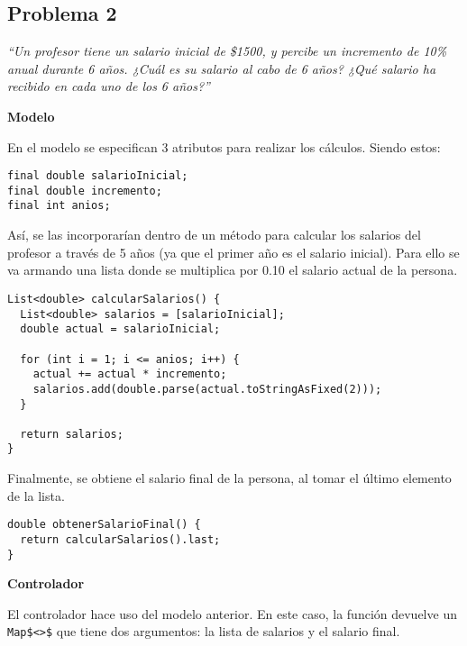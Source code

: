 \subsection{Problema 2}

\textit {“Un profesor tiene un salario inicial de \$1500, y percibe un incremento de 10\% anual durante 6 años. ¿Cuál es su salario al cabo de 6 años? ¿Qué salario ha recibido en cada uno de los 6 años?”}

\textbf{Modelo}

En el modelo se especifican 3 atributos para realizar los cálculos. Siendo estos:

\begin{center}
\begin{lstlisting}
final double salarioInicial;
final double incremento;
final int anios;
\end{lstlisting}
\end{center}

Así, se las incorporarían dentro de un método para calcular los salarios del profesor a través de 5 años (ya que el primer año es el salario inicial). Para ello se va armando una lista donde se multiplica por 0.10 el salario actual de la persona.

\begin{center}
\begin{lstlisting}
List<double> calcularSalarios() {
  List<double> salarios = [salarioInicial];
  double actual = salarioInicial;

  for (int i = 1; i <= anios; i++) {
    actual += actual * incremento;
    salarios.add(double.parse(actual.toStringAsFixed(2)));
  }

  return salarios;
}
\end{lstlisting}
\end{center}

Finalmente, se obtiene el salario final de la persona, al tomar el último elemento de la lista.

\begin{center}
\begin{lstlisting}
double obtenerSalarioFinal() {
  return calcularSalarios().last;
}
\end{lstlisting}
\end{center}

\textbf{Controlador}

El controlador hace uso del modelo anterior. En este caso, la función devuelve un \lstinline{Map$<>$} que tiene dos argumentos: la lista de salarios y el salario final.

